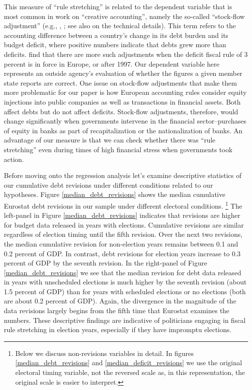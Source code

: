 \documentclass[]{article}
\begin{document}
This measure of ``rule stretching'' is related to the dependent variable that is most common in work on ``creative accounting'', namely the so-called ``stock-flow adjustment'' (e.g., \cite{vonHagenWolff2006}, \cite{Alt2014}; see also \cite{Seiferling2013} on the technical details).  This term refers to the accounting difference between a country's change in its debt burden and its budget deficit, where positive numbers indicate that debts grew more than deficits.  \cite{vonHagenWolff2006} find that there are more such adjustments when the deficit fiscal rule of 3 percent is in force in Europe, or after 1997.  Our dependent variable here represents an outside agency's evaluation of whether the figures a given member state reports are correct.  One issue on stock-flow adjustments that make them more problematic for our paper is how European accounting rules consider equity injections into public companies as well as transactions in financial assets. Both affect debts but do not affect deficits. Stock-flow adjustments, therefore, would change significantly when governments intervene in the financial sector--purchases of equity in banks as part of recapitalization or the nationalization of banks.  An advantage of our measure is that we can check whether there was ``rule stretching'' even during times of high financial stress when governments took action.  

Before moving onto the regression analysis let's examine descriptive statistics of our cumulative debt revisions under different conditions related to our hypotheses. Figure \ref{median_debt_revisions} shows the median cumulative Eurostat debt revisions in our sample under different electoral conditions.  \footnote{Below we discuss non-revisions variables in detail. In figures \ref{median_debt_revisions} and \ref{median_deficit_revisions} we use the original electoral timing variable, not the reversed scale as, in this representation, the original scale is easier to interpret.} The left-panel in Figure \ref{median_debt_revisions} indicates that revisions are higher for budget data released in years with elections. Cumulative revisions are similar regardless of election timing until the fifth revision. Over the next two revisions, the median cumulative revision for non-election years remains between 0.1 and 0.2 percent of GDP. In contrast, debt revisions for election years increase to 0.3 percent of GDP by the seventh revision. In the right-panel of Figure \ref{median_debt_revisions} we see that the median revision for debt data released in years with unscheduled elections is much higher by the seventh revision (about 1.5 percent of GDP) than for years with scheduled elections or no elections (both are about 0.2 percent of GDP). Again, the divergence in the magnitude of the data revisions largely begins from the fifth time that Eurostat examines the numbers. These descriptive findings are indicative of politicians engaging in fiscal rule stretching in election years, especially if they have impromptu elections.
\end{document}
